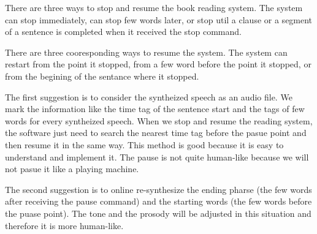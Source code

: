 \documentclass[12pt]{article}
\newenvironment{problem}[2][Problem]{\begin{trivlist}
\item[\hskip \labelsep {\bfseries #1}\hskip \labelsep {\bfseries #2.}]}{\end{trivlist}}
\begin{document}
\begin{problem}{2.3}


    There are three ways to stop and resume the book reading system. The system
    can stop immediately, can stop few words later, or stop util a clause or 
    a segment of a sentence is completed when it received the stop command. 

    There are three cooresponding ways to resume the system. The system can restart
    from the point it stopped, from a few word before the point it stopped, or
    from the begining of the sentance where it stopped.    

    The first suggestion is to consider the syntheized speech as an audio file.
    We mark the information like the time tag of the sentence start 
    and the tags of few words for every syntheized speech. When we stop and resume
    the reading system, the software just need to search the nearest time tag 
    before the pasue point and then resume it in the same way.
    This method is good because it is easy to understand and implement it.
    The pause is not quite human-like because we will not pasue it like a playing
    machine.

    The second suggestion is to online re-synthesize the ending pharse 
    (the few words after receiving the pause command) and the 
    starting words (the few words before the puase point). The tone and the prosody
    will be adjusted in this situation and therefore it is more human-like.


\end{problem}
\end{document}
